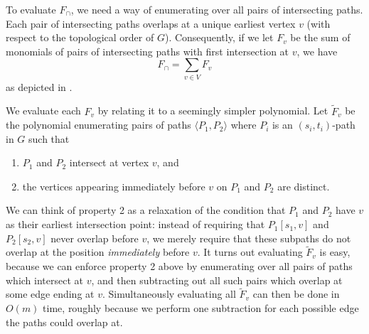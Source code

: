 \documentclass[11pt]{article}
\newcommand{\pair}[1]{\langle #1\rangle}
\theoremstyle{definition}
\newcommand\nicole[1]{\textcolor{red}{Nicole says: #1}}
\begin{document}
To evaluate $F_{\cap}$, we need a way of enumerating over all pairs of intersecting paths. 
Each pair of intersecting paths overlaps at a unique earliest vertex $v$ (with respect to the topological order of $G$).
Consequently, if we let $F_v$ be the sum of monomials of pairs of intersecting paths with first intersection at $v$, we have 
    \begin{equation}
    \label{overview-disj}
    F_{\cap} = \sum_{v\in V} F_v
    \end{equation}
as depicted in .

We evaluate each $F_v$ by relating it to a seemingly simpler polynomial.
Let $\tilde{F}_v$ be the polynomial enumerating pairs of paths $\pair{P_1,P_2}$ where $P_i$ is an $(s_i,t_i)$-path in $G$ such that
\begin{enumerate}
    \item $P_1$ and $P_2$ intersect at vertex $v$, and 
    \item the vertices appearing immediately before $v$ on $P_1$ and $P_2$ are distinct.
\end{enumerate}

We can think of property 2
as a relaxation of the condition that $P_1$ and $P_2$ have $v$ as their earliest intersection point: instead of requiring that $P_1[s_1,v]$ and $P_2[s_2,v]$ never overlap before $v$, we merely require that these subpaths do not overlap at the  position \emph{immediately} before $v$.
It turns out evaluating $\tilde{F}_v$ is easy, because we can enforce property 2 above by enumerating over all pairs of paths which intersect at $v$, and then subtracting out all such pairs  which overlap at some edge ending at $v$.
Simultaneously evaluating all $\tilde{F}_v$ can then be done in $O(m)$ time, roughly because we perform one subtraction for each possible edge the paths could overlap at.
\end{document}
